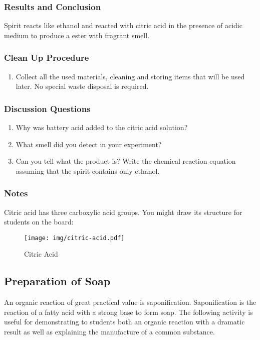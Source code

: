 \subsubsection*{Results and Conclusion}
Spirit reacts like ethanol and reacted with citric acid in the presence of acidic medium to produce a ester with fragrant smell.

\subsubsection*{Clean Up Procedure}
\begin{enumerate}
\item{Collect all the used materials, cleaning and storing items that will be used later. No special waste disposal is required.}
\end{enumerate}

\subsubsection*{Discussion Questions}
\begin{enumerate}
\item{Why was battery acid added to the citric acid solution?}
\item{What smell did you detect in your experiment?}
\item{Can you tell what the product is? Write the chemical reaction equation assuming that the spirit contains only ethanol.}
\end{enumerate}

\subsubsection*{Notes}
Citric acid has three carboxylic acid groups. You might draw its structure for students on the board: 
\begin{center}
\begin{figure}[h]
\begin{center}\texttt{[image: img/citric-acid.pdf]}\end{center}
\caption{Citric Acid}
\end{figure}
\end{center}


\subsection{Preparation of Soap}

An organic reaction of great practical value is saponification. Saponification is the reaction of a fatty acid with a strong base to form soap. The following activity is useful for demonstrating to students both an organic reaction with a dramatic result as well as explaining the manufacture of a common substance.

